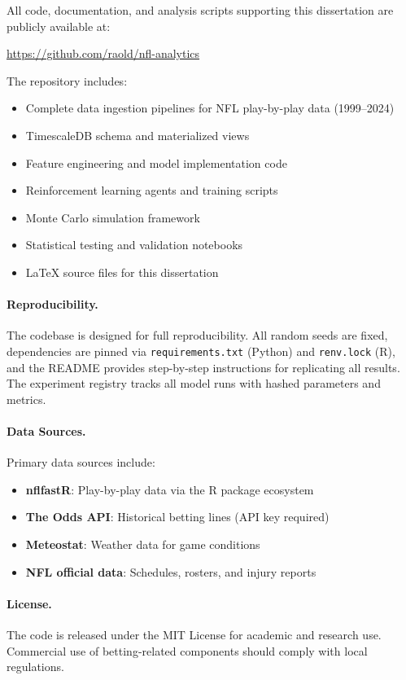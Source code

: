 \documentclass[12pt]{report}  %
\numberwithin{equation}{section}
\theoremstyle{plain}
\theoremstyle{definition}
\theoremstyle{remark}
\begin{document}
All code, documentation, and analysis scripts supporting this dissertation are publicly available at:

\begin{center}
\url{https://github.com/raold/nfl-analytics}
\end{center}

The repository includes:
\begin{itemize}
  \item Complete data ingestion pipelines for NFL play-by-play data (1999--2024)
  \item TimescaleDB schema and materialized views
  \item Feature engineering and model implementation code
  \item Reinforcement learning agents and training scripts
  \item Monte Carlo simulation framework
  \item Statistical testing and validation notebooks
  \item LaTeX source files for this dissertation
\end{itemize}

\paragraph{Reproducibility.}
The codebase is designed for full reproducibility. All random seeds are fixed, dependencies are pinned via \texttt{requirements.txt} (Python) and \texttt{renv.lock} (R), and the README provides step-by-step instructions for replicating all results. The experiment registry tracks all model runs with hashed parameters and metrics.

\paragraph{Data Sources.}
Primary data sources include:
\begin{itemize}
  \item \textbf{nflfastR}: Play-by-play data via the R package ecosystem
  \item \textbf{The Odds API}: Historical betting lines (API key required)
  \item \textbf{Meteostat}: Weather data for game conditions
  \item \textbf{NFL official data}: Schedules, rosters, and injury reports
\end{itemize}

\paragraph{License.}
The code is released under the MIT License for academic and research use. Commercial use of betting-related components should comply with local regulations.
\end{document}
